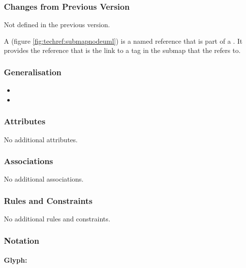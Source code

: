 \subsubsection{Changes from Previous Version}

Not defined in the previous version.

\label{defn:SubmapTerminal}

A  (figure \ref{fig:techref:submapnodeuml}) is a named reference that is part of a
. It provides the reference that is the link to a
tag in the submap that the  refers to.

\subsubsection{Generalisation}

\begin{itemize}
\item {}
\item {}
\end{itemize}

\subsubsection{Attributes}

No additional attributes.

\subsubsection{Associations}

No additional associations.

\subsubsection{Rules and Constraints}

No additional rules and constraints.

\subsubsection{Notation}

\paragraph{Glyph: }

